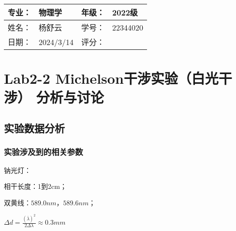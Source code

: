 \documentclass[dvipsnames, svgnames,a4paper,11pt]{article}
\begin{document}
	\begin{table}
		\renewcommand\arraystretch{1.7}
		\begin{tabularx}{\textwidth}{|X|X|X|X|}
			\hline
			专业：& 物理学 &年级：& 2022级\\
			\hline
			姓名： & 杨舒云 & 学号：& 22344020\\
			\hline
			日期：& 2024/3/14 & 评分： &\\
			\hline
		\end{tabularx}
	\end{table}
	
	\section{Lab2-2 Michelson干涉实验（白光干涉） \quad\heiti 分析与讨论}
	
	\subsection{实验数据分析}
	
	\subsubsection{实验涉及到的相关参数}
	钠光灯：
	
	相干长度：1到2cm；
	
	双黄线：$589.0nm$，$589.6nm$；
	
	$\Delta d = \frac{(\bar{\lambda})^2}{2\Delta\lambda}\approx 0.3mm$
	
\end{document}
